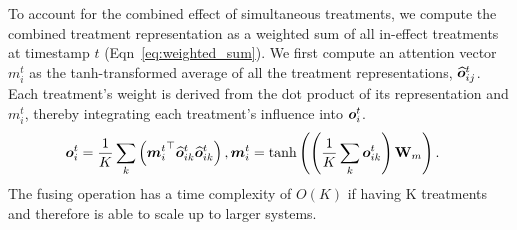 To account for the combined effect of simultaneous treatments, we compute the combined treatment representation as a weighted sum of all in-effect treatments at timestamp $t$ (Eqn~\ref{eq:weighted_sum}). We first compute an attention vector $m_i^t$ as the tanh-transformed average of all the treatment representations, $\widehat{\bm{o}}_{ij}^{t}$. Each treatment's weight is derived from the dot product of its representation and $m_i^t$, thereby integrating each treatment's influence into $\bm{o}_i^t$.
\begin{equation}
\label{eq:weighted_sum}
\begin{aligned}
\bm{o}_i^t &= \frac{1}{K} \sum_{k} \left({\bm{m}_i^t}^\top \widehat{\bm{o}}_{ik}^{t} \widehat{\bm{o}}_{ik}^{t}\right), \bm{m}_i^t = \text{tanh}\left(\left(\frac{1}{K} \sum_{k} \bm{o}_{ik}^{t}  \right)\mathbf{W}_m\right)  .  
\end{aligned}
\end{equation}
{The fusing operation has a time complexity of $O(K)$ if having K treatments and therefore is able to scale up to larger systems.}





